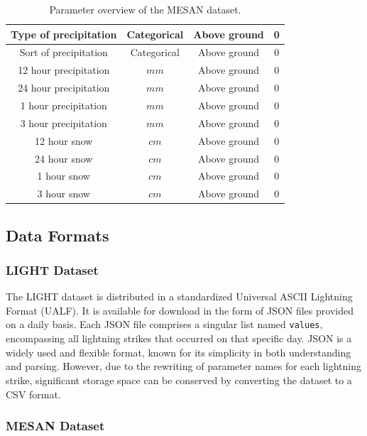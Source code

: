 \begin{table}[h]
\begin{tabular}{|c|c|c|c|}
		\hline
		Type of precipitation              & Categorical & Above ground      & 0 \\
		\hline
		Sort of precipitation              & Categorical & Above ground      & 0 \\
		\hline
		12 hour precipitation              & $mm$        & Above ground      & 0 \\
		\hline
		24 hour precipitation              & $mm$        & Above ground      & 0 \\
		\hline
		1 hour precipitation               & $mm$        & Above ground      & 0 \\
		\hline
		3 hour precipitation               & $mm$        & Above ground      & 0 \\
		\hline
		12 hour snow                       & $cm$        & Above ground      & 0 \\
		\hline
		24 hour snow                       & $cm$        & Above ground      & 0 \\
		\hline
		1 hour snow                        & $cm$        & Above ground      & 0 \\
		\hline
		3 hour snow                        & $cm$        & Above ground      & 0 \\
		\hline
	\end{tabular}
	\caption{Parameter overview of the MESAN dataset.}
	\label{tab:mesan}
\end{table}

\subsection{Data Formats}

\subsubsection{LIGHT Dataset}
\label{sec:format-light}

The LIGHT dataset is distributed in a standardized Universal ASCII Lightning Format (UALF). It is available for download in the form of JSON files provided on a daily basis. Each JSON file comprises a singular list named \texttt{values}, encompassing all lightning strikes that occurred on that specific day. JSON is a widely used and flexible format, known for its simplicity in both understanding and parsing. However, due to the rewriting of parameter names for each lightning strike, significant storage space can be conserved by converting the dataset to a CSV format.

\subsubsection{MESAN Dataset}
\label{sec:format-mesan}

